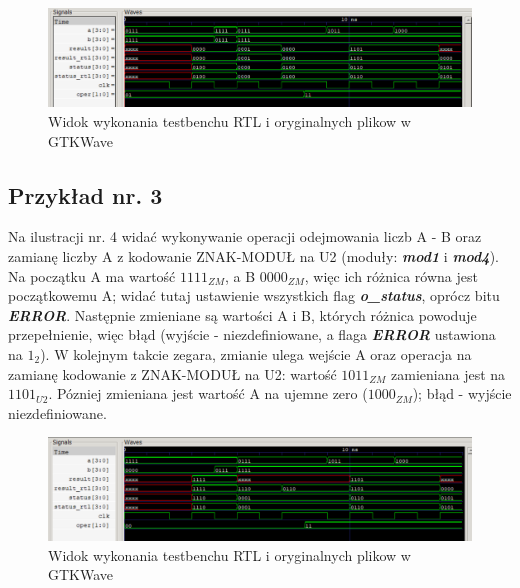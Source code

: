 \begin{figure}[h!]
	\centering
	\includegraphics[width=1\linewidth]{img2}
	\caption{Widok wykonania testbenchu RTL i oryginalnych plikow w GTKWave}
	\label{fig:img1}
\end{figure}

\newpage

\subsection{Przykład nr. 3}

Na ilustracji nr. 4 widać wykonywanie operacji odejmowania liczb A - B oraz zamianę liczby A z kodowanie ZNAK-MODUŁ na U2 (moduły: \textbf{\emph{mod1}} i \textbf{\emph{mod4}}). Na początku A ma wartość \(1111_{ZM}\), a B \(0000_{ZM}\), więc ich różnica równa jest początkowemu A; widać tutaj ustawienie wszystkich flag \textbf{\emph{o\_status}}, oprócz bitu \textbf{\emph{ERROR}}. Następnie zmieniane są wartości A i B, których różnica powoduje przepełnienie, więc błąd (wyjście - niezdefiniowane, a flaga \textbf{\emph{ERROR}} ustawiona na \(1_2\)). W kolejnym takcie zegara, zmianie ulega wejście A oraz operacja na zamianę kodowanie z ZNAK-MODUŁ na U2: wartość \(1011_{ZM}\) zamieniana jest na \(1101_{U2}\). Pózniej zmieniana jest wartość A na ujemne zero (\(1000_{ZM}\)); błąd - wyjście niezdefiniowane.

\begin{figure}[h!]
	\centering
	\includegraphics[width=1\linewidth]{img3}
	\caption{Widok wykonania testbenchu RTL i oryginalnych plikow w GTKWave}
	\label{fig:img1}
\end{figure}
